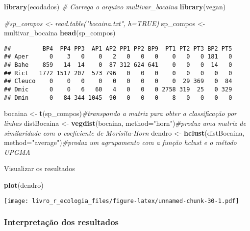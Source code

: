 \documentclass[
]{book}
\newenvironment{Shaded}{\begin{snugshade}}{\end{snugshade}}
\newcommand{\CommentTok}[1]{\textcolor[rgb]{0.56,0.35,0.01}{\textit{#1}}}
\newcommand{\DataTypeTok}[1]{\textcolor[rgb]{0.13,0.29,0.53}{#1}}
\newcommand{\KeywordTok}[1]{\textcolor[rgb]{0.13,0.29,0.53}{\textbf{#1}}}
\newcommand{\NormalTok}[1]{#1}
\newcommand{\StringTok}[1]{\textcolor[rgb]{0.31,0.60,0.02}{#1}}
\begin{document}
\begin{Shaded}
\begin{Highlighting}[]
\KeywordTok{library}\NormalTok{(ecodados) }\CommentTok{# Carrega o arquivo multivar_bocaina}
\KeywordTok{library}\NormalTok{(vegan)}


\CommentTok{#sp_compos <- read.table("bocaina.txt", h=TRUE)}
\NormalTok{sp_compos  <-}\StringTok{ }\NormalTok{multivar_bocaina}
\KeywordTok{head}\NormalTok{(sp_compos)}
\end{Highlighting}
\end{Shaded}

\begin{verbatim}
##         BP4  PP4 PP3  AP1 AP2 PP1 PP2 BP9  PT1 PT2 PT3 BP2 PT5
## Aper      0    3   0    0   2   0   0   0    0   0   0 181   0
## Bahe    859   14  14    0  87 312 624 641    0   0   0  14   0
## Rict   1772 1517 207  573 796   0   0   0    0   0   0   0   0
## Cleuco    0    0   0    0   0   0   0   0    0  29 369   0  84
## Dmic      0    0   6   60   4   0   0   0 2758 319  25   0 329
## Dmin      0   84 344 1045  90   0   0   0    8   0   0   0   0
\end{verbatim}

\begin{Shaded}
\begin{Highlighting}[]
\NormalTok{bocaina <-}\StringTok{ }\KeywordTok{t}\NormalTok{(sp_compos)}\CommentTok{#transpondo a matriz para obter a classificação por linhas}
\NormalTok{distBocaina <-}\StringTok{ }\KeywordTok{vegdist}\NormalTok{(bocaina, }\DataTypeTok{method=}\StringTok{"horn"}\NormalTok{)}\CommentTok{#produz uma matriz de similaridade com o coeficiente de Morisita-Horn}
\NormalTok{dendro <-}\StringTok{ }\KeywordTok{hclust}\NormalTok{(distBocaina, }\DataTypeTok{method=}\StringTok{"average"}\NormalTok{)}\CommentTok{#produz um agrupamento com a função hclust e o método UPGMA}
\end{Highlighting}
\end{Shaded}

Visualizar os resultados

\begin{Shaded}
\begin{Highlighting}[]
\KeywordTok{plot}\NormalTok{(dendro)}
\end{Highlighting}
\end{Shaded}

\texttt{[image: livro\_r\_ecologia\_files/figure-latex/unnamed-chunk-30-1.pdf]}

\hypertarget{interpretauxe7uxe3o-dos-resultados}{%
\subsubsection{Interpretação dos resultados}\label{interpretauxe7uxe3o-dos-resultados}}
\end{document}
